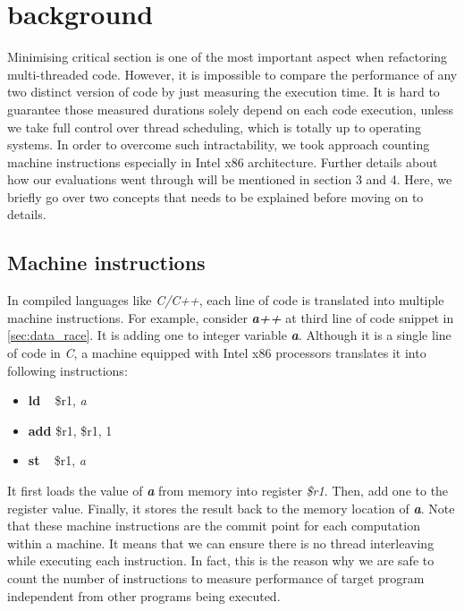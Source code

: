 \section{background}

Minimising critical section is one of the most important aspect when refactoring multi-threaded code. However, it is impossible to compare the performance of any two distinct version of code by just measuring the execution time. It is hard to guarantee those measured durations solely depend on each code execution, unless we take full control over thread scheduling, which is totally up to operating systems. In order to overcome such intractability, we took approach counting machine instructions especially in Intel x86 architecture. Further details about how our evaluations went through will be mentioned in section 3 and 4. Here, we briefly go over two concepts that needs to be explained before moving on to details.



\subsection{Machine instructions}
In compiled languages like \textit{C/C++}, each line of code is translated into multiple machine instructions. For example, consider \textbf{\textit{a++}} at third line of code snippet in \ref{sec:data_race}. It is adding one to integer variable \textbf{\textit{a}}. Although it is a single line of code in \textit{C}, a machine equipped with Intel x86 processors translates it into following instructions:
\begin{itemize}
	\item[] \textbf{ld} \,\,\, \$r1, \textit{a}
	\item[] \textbf{add} \$r1, \$r1, 1
	\item[] \textbf{st} \,\,\, \$r1, \textit{a}
\end{itemize}

It first loads the value of \textbf{\textit{a}} from memory into register \textit{\$r1}. Then, add one to the register value. Finally, it stores the result back to the memory location of \textbf{\textit{a}}. Note that these machine instructions are the commit point for each computation within a machine. It means that we can ensure there is no thread interleaving while executing each instruction. In fact, this is the reason why we are safe to count the number of instructions to measure performance of target program independent from other programs being executed.